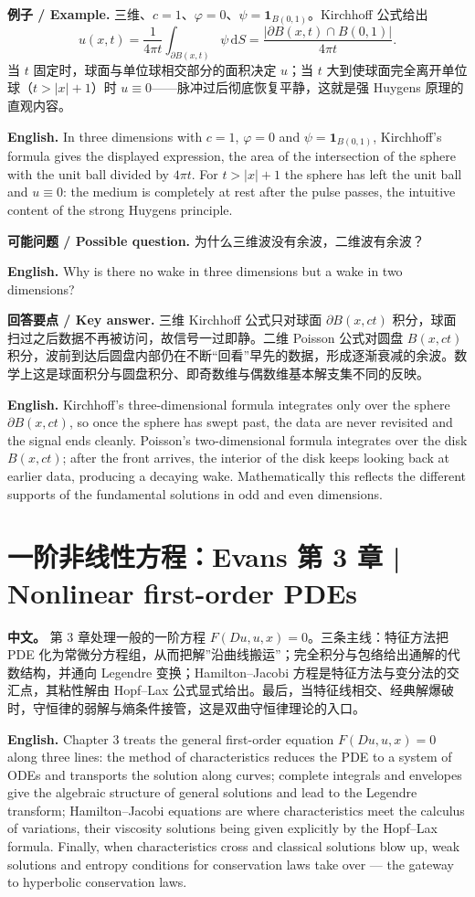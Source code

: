\documentclass[UTF8,11pt,a4paper]{ctexart}
\newcommand{\APS}[2]{\par\noindent\textbf{中文。} #1\par\noindent\textbf{English.} #2\par\smallskip}
\newcommand{\EN}[1]{\par\noindent \textbf{English.} #1\par}
\newcommand{\EX}[2]{\par\noindent \textbf{例子 / Example.} #1\par\EN{#2}}
\newcommand{\ASK}[4]{\par\noindent \textbf{可能问题 / Possible question.} #1\par\EN{#2}\noindent \textbf{回答要点 / Key answer.} #3\par\EN{#4}\medskip}
\newcommand{\dd}{\mathrm{d}}
\begin{document}
\EX{三维、$c=1$、$\varphi=0$、$\psi=\mathbf 1_{B(0,1)}$。Kirchhoff 公式给出
\[
u(x,t)=\frac{1}{4\pi t}\int_{\partial B(x,t)}\psi\,\dd S=\frac{|\partial B(x,t)\cap B(0,1)|}{4\pi t}.
\]
当 $t$ 固定时，球面与单位球相交部分的面积决定 $u$；当 $t$ 大到使球面完全离开单位球（$t>|x|+1$）时 $u\equiv0$——脉冲过后彻底恢复平静，这就是强 Huygens 原理的直观内容。}{In three dimensions with $c=1$, $\varphi=0$ and $\psi=\mathbf 1_{B(0,1)}$, Kirchhoff's formula gives the displayed expression, the area of the intersection of the sphere with the unit ball divided by $4\pi t$. For $t>|x|+1$ the sphere has left the unit ball and $u\equiv0$: the medium is completely at rest after the pulse passes, the intuitive content of the strong Huygens principle.}

\ASK{为什么三维波没有余波，二维波有余波？}{Why is there no wake in three dimensions but a wake in two dimensions?}{三维 Kirchhoff 公式只对球面 $\partial B(x,ct)$ 积分，球面扫过之后数据不再被访问，故信号一过即静。二维 Poisson 公式对圆盘 $B(x,ct)$ 积分，波前到达后圆盘内部仍在不断``回看''早先的数据，形成逐渐衰减的余波。数学上这是球面积分与圆盘积分、即奇数维与偶数维基本解支集不同的反映。}{Kirchhoff's three-dimensional formula integrates only over the sphere $\partial B(x,ct)$, so once the sphere has swept past, the data are never revisited and the signal ends cleanly. Poisson's two-dimensional formula integrates over the disk $B(x,ct)$; after the front arrives, the interior of the disk keeps looking back at earlier data, producing a decaying wake. Mathematically this reflects the different supports of the fundamental solutions in odd and even dimensions.}

\section{一阶非线性方程：Evans 第 3 章 | Nonlinear first-order PDEs}
\APS{第 3 章处理一般的一阶方程 $F(Du,u,x)=0$。三条主线：特征方法把 PDE 化为常微分方程组，从而把解''沿曲线搬运''；完全积分与包络给出通解的代数结构，并通向 Legendre 变换；Hamilton--Jacobi 方程是特征方法与变分法的交汇点，其粘性解由 Hopf--Lax 公式显式给出。最后，当特征线相交、经典解爆破时，守恒律的弱解与熵条件接管，这是双曲守恒律理论的入口。}{Chapter 3 treats the general first-order equation $F(Du,u,x)=0$ along three lines: the method of characteristics reduces the PDE to a system of ODEs and transports the solution along curves; complete integrals and envelopes give the algebraic structure of general solutions and lead to the Legendre transform; Hamilton--Jacobi equations are where characteristics meet the calculus of variations, their viscosity solutions being given explicitly by the Hopf--Lax formula. Finally, when characteristics cross and classical solutions blow up, weak solutions and entropy conditions for conservation laws take over — the gateway to hyperbolic conservation laws.}
\end{document}
